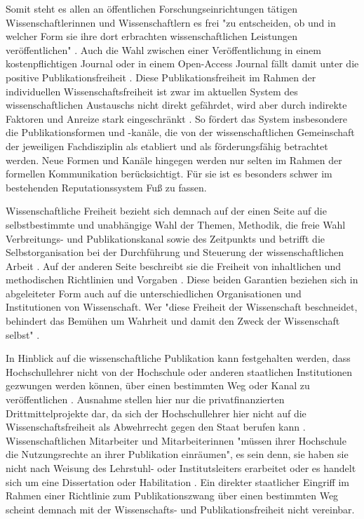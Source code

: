 Somit steht es allen an öffentlichen Forschungseinrichtungen tätigen Wissenschaftlerinnen und Wissenschaftlern es frei "zu entscheiden, ob und in welcher Form sie ihre dort erbrachten wissenschaftlichen Leistungen veröffentlichen" \cite{Schmidt_2009}. Auch die Wahl zwischen einer Veröffentlichung in einem kostenpflichtigen Journal oder in einem Open-Access Journal fällt damit unter die positive Publikationsfreiheit \cite[:190]{Fehling_2014}. Diese Publikationsfreiheit
im Rahmen der individuellen Wissenschaftsfreiheit ist zwar im aktuellen System des wissenschaftlichen Austauschs nicht direkt gefährdet, wird aber durch indirekte Faktoren und Anreize stark eingeschränkt \cite{binswanger_2014_excellence}. So fördert das System insbesondere die Publikationsformen und -kanäle, die von der wissenschaftlichen Gemeinschaft der jeweiligen Fachdisziplin als etabliert und als förderungsfähig betrachtet werden. Neue Formen und Kanäle hingegen werden nur selten im Rahmen der formellen Kommunikation berücksichtigt. Für sie ist es besonders schwer im bestehenden Reputationssystem Fuß zu fassen.

Wissenschaftliche Freiheit bezieht sich demnach auf der einen Seite auf die selbstbestimmte und unabhängige Wahl der Themen, Methodik, die freie Wahl Verbreitungs- und Publikationskanal sowie des Zeitpunkts und betrifft die Selbstorganisation bei der Durchführung und Steuerung der wissenschaftlichen Arbeit \cite{Fehling_2014}. Auf der anderen Seite beschreibt sie die Freiheit von inhaltlichen und methodischen Richtlinien und Vorgaben \cite{Goetting_2015}. Diese beiden Garantien beziehen sich in abgeleiteter Form auch auf die unterschiedlichen Organisationen und Institutionen von Wissenschaft. Wer "diese Freiheit der Wissenschaft beschneidet, behindert das Bemühen um Wahrheit und damit den Zweck der Wissenschaft selbst" \cite{Oezmen_2015}.

In Hinblick auf die wissenschaftliche Publikation kann festgehalten werden, dass Hochschullehrer nicht von der Hochschule oder anderen staatlichen Institutionen gezwungen werden können, über einen bestimmten Weg oder Kanal zu veröffentlichen \cite{spindler_2006_rechtloa} \cite{dorschel_2006_open}. Ausnahme stellen hier nur die privatfinanzierten Drittmittelprojekte dar, da sich der Hochschullehrer hier nicht auf die Wissenschaftsfreiheit als Abwehrrecht gegen den Staat berufen kann \cite{spindler_2006_rechtloa}. Wissenschaftlichen Mitarbeiter und Mitarbeiterinnen "müssen ihrer Hochschule die Nutzungsrechte an ihrer Publikation einräumen", es sein denn, sie haben sie nicht nach Weisung des Lehrstuhl- oder Institutsleiters erarbeitet oder es handelt sich um eine Dissertation oder Habilitation \cite{spindler_2006_rechtloa}. Ein direkter staatlicher Eingriff im Rahmen einer Richtlinie zum Publikationszwang über einen bestimmten Weg scheint demnach mit der Wissenschafts- und Publikationsfreiheit nicht vereinbar.


